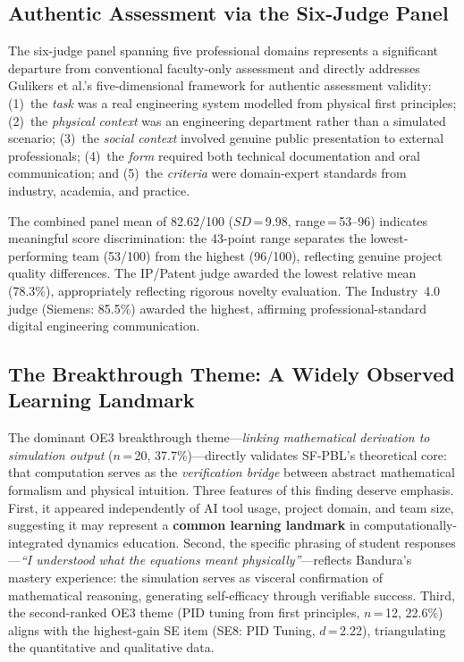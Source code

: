 \documentclass[utf8]{FrontiersinHarvard}
\begin{document}
\subsection{Authentic Assessment via the Six-Judge Panel}

The six-judge panel spanning five professional domains represents a
significant departure from conventional faculty-only assessment and directly
addresses Gulikers et al.'s \citeyearpar{gulikers2004five} five-dimensional
framework for authentic assessment validity: (1)~the \textit{task} was
a real engineering system modelled from physical first principles;
(2)~the \textit{physical context} was an engineering department rather
than a simulated scenario; (3)~the \textit{social context} involved
genuine public presentation to external professionals; (4)~the
\textit{form} required both technical documentation and oral communication;
and (5)~the \textit{criteria} were domain-expert standards from industry,
academia, and practice.

The combined panel mean of 82.62/100 ($SD$\,=\,9.98, range\,=\,53--96)
{\color{blue} indicates meaningful score discrimination}: the 43-point range separates
the lowest-performing team (53/100) from the highest (96/100), reflecting
genuine project quality differences. The IP/Patent judge awarded the lowest
relative mean (78.3\%), appropriately reflecting rigorous novelty
evaluation. The Industry~4.0 judge (Siemens: 85.5\%) awarded the highest,
affirming professional-standard digital engineering communication.

{\color{blue} \subsection{The Breakthrough Theme: A Widely Observed Learning Landmark}}

The dominant OE3 breakthrough theme---\textit{linking mathematical
derivation to simulation output} ($n$\,=\,20, 37.7\%)---directly validates
SF-PBL's theoretical core: that computation serves as the
\textit{verification bridge} between abstract mathematical formalism and
physical intuition. Three features of this finding deserve emphasis.
First, it appeared independently of AI tool usage, project domain, and team
size, {\color{blue} suggesting it may represent a \textbf{common learning landmark}} in
computationally-integrated dynamics education. Second, the specific phrasing
of student responses---\textit{``I understood what the equations meant
physically''}---reflects Bandura's \citeyearpar{bandura1997self} mastery
experience: the simulation serves as visceral confirmation of mathematical
reasoning, generating self-efficacy through verifiable success. Third, the
second-ranked OE3 theme (PID tuning from first principles, $n$\,=\,12,
22.6\%) aligns with the highest-gain SE item (SE8: PID Tuning,
$d$\,=\,2.22), triangulating the quantitative and qualitative data.
\end{document}
